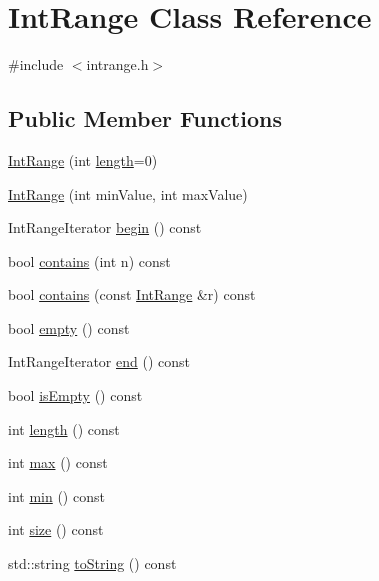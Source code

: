 \hypertarget{classIntRange}{}\section{Int\+Range Class Reference}
\label{classIntRange}


{\ttfamily \#include $<$intrange.\+h$>$}

\subsection*{Public Member Functions}
\begin{DoxyCompactItemize}
\item 
\mbox{\hyperlink{classIntRange_a1371e812388f10db89e8cea0edeec000}{Int\+Range}} (int \mbox{\hyperlink{classIntRange_a91213974fa3ac3959b1c355a9e588f8d}{length}}=0)
\item 
\mbox{\hyperlink{classIntRange_a9e8543f0451b16061adafee2d9ad0f84}{Int\+Range}} (int min\+Value, int max\+Value)
\item 
Int\+Range\+Iterator \mbox{\hyperlink{classIntRange_a71b24b84d58ec13662a463eddc2e085c}{begin}} () const
\item 
bool \mbox{\hyperlink{classIntRange_ab0197de90231da6a241cf66cd6b16edc}{contains}} (int n) const
\item 
bool \mbox{\hyperlink{classIntRange_a71626971ecae788078a3ba3e7ffc7201}{contains}} (const \mbox{\hyperlink{classIntRange}{Int\+Range}} \&r) const
\item 
bool \mbox{\hyperlink{classIntRange_a644718bb2fb240de962dc3c9a1fdf0dc}{empty}} () const
\item 
Int\+Range\+Iterator \mbox{\hyperlink{classIntRange_ad919bd40bd4298cafd0955b8031f4bef}{end}} () const
\item 
bool \mbox{\hyperlink{classIntRange_acf82f9b2937375c7b1cf3dccb3df3312}{is\+Empty}} () const
\item 
int \mbox{\hyperlink{classIntRange_a91213974fa3ac3959b1c355a9e588f8d}{length}} () const
\item 
int \mbox{\hyperlink{classIntRange_a86ad4228f3fccc681e8716ac9c68ab4d}{max}} () const
\item 
int \mbox{\hyperlink{classIntRange_a4ec1ccea7eddbc7355ba5d00afcaec2d}{min}} () const
\item 
int \mbox{\hyperlink{classIntRange_af9593d4a5ff4274efaf429cb4f9e57cc}{size}} () const
\item 
std\+::string \mbox{\hyperlink{classIntRange_a1fe5121d6528fdea3f243321b3fa3a49}{to\+String}} () const
\end{DoxyCompactItemize}


